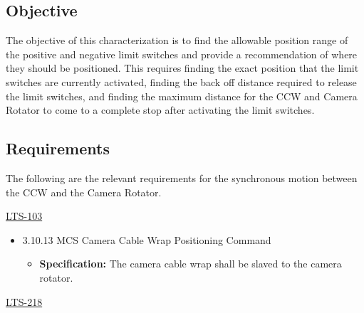 \documentclass[SE,lsstdraft,authoryear,toc]{lsstdoc}
\begin{document}
\subsection{Objective}

The objective of this characterization is to find the allowable position
range of the positive and negative limit switches and provide a
recommendation of where they should be positioned. This requires finding
the exact position that the limit switches are currently activated,
finding the back off distance required to release the limit switches,
and finding the maximum distance for the CCW and Camera Rotator to come
to a complete stop after activating the limit switches.

\subsection{Requirements}

The following are the relevant requirements for the synchronous motion
between the CCW and the Camera Rotator.

\underline{LTS-103}

\begin{itemize}
\item
  3.10.13 MCS Camera Cable Wrap Positioning Command

  \begin{itemize}
  \item
    \textbf{Specification:} The camera cable wrap shall be slaved to the
    camera rotator.
  \end{itemize}
\end{itemize}

\underline{LTS-218}
\end{document}
